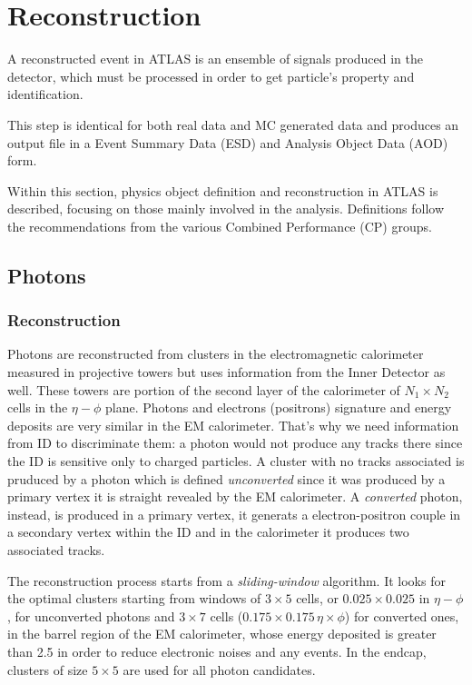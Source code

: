 
\section{Reconstruction}
\label{sec:recoreal}

A reconstructed event in ATLAS is an ensemble of signals produced in the detector, which must be processed in order to get particle's property and identification. 

This step is identical for both real data and MC generated data and produces an output file in a Event Summary Data (ESD) and Analysis Object Data (AOD) form. 

Within this section, physics object definition and reconstruction in ATLAS is described, focusing on those mainly involved in the \mph analysis. Definitions follow the recommendations from the various Combined Performance (CP) groups.



\subsection{Photons}
\label{photons}
\subsubsection{Reconstruction}
Photons are reconstructed from clusters in the electromagnetic calorimeter measured in projective towers but uses information from the Inner Detector as well. These towers are portion of the second layer of the calorimeter of $N_1 \times N_2$ cells in the $\eta-\phi$ plane. Photons and electrons (positrons) signature and energy deposits are very similar in the EM calorimeter. That's why we need information from ID to discriminate them: a photon would not produce any tracks there since the ID is sensitive only to charged particles. A cluster with no tracks associated is pruduced by a photon which is defined \emph{unconverted} since it was produced by a primary vertex it is straight revealed by the EM calorimeter. A \emph{converted} photon, instead, is produced in a primary vertex, it generats a electron-positron couple in a secondary vertex within the ID and in the calorimeter it produces two associated tracks.

The reconstruction process starts from a \emph{sliding-window} algorithm. It looks for the optimal clusters starting from windows of $3\times5$ cells, or $0.025\times0.025$ in $\eta-\phi$, for unconverted photons and $3\times7$ cells ($0.175\times0.175 \, \eta\times\phi$) for converted ones, in the barrel region of the EM calorimeter, whose energy deposited is greater than \SI{2.5}{\gev} in order to reduce electronic noises and any \pileup events. In the endcap, clusters of size $5\times5$ are used for all photon candidates.

